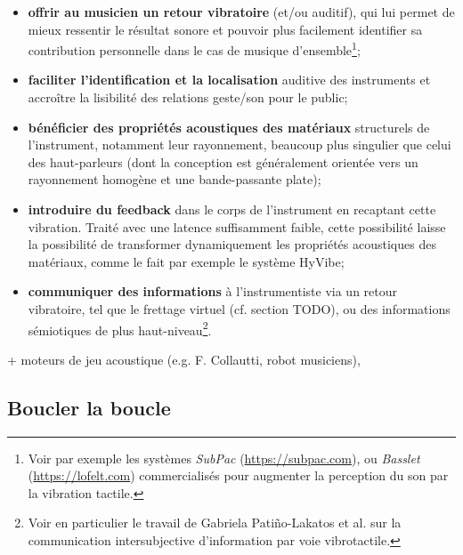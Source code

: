 \vspace{-1em}
\begin{itemize}[noitemsep]
	\item \textbf{offrir au musicien un retour vibratoire} (et/ou auditif), qui lui permet de mieux ressentir le résultat sonore et pouvoir plus facilement identifier sa contribution personnelle dans le cas de musique d'ensemble\footnote{Voir par exemple les systèmes \textit{SubPac} (\url{https://subpac.com}), ou \textit{Basslet} (\url{https://lofelt.com}) commercialisés pour augmenter la perception du son par la vibration tactile.};
	\item \textbf{faciliter l'identification et la localisation} auditive des instruments et accroître la lisibilité des relations geste/son pour le public;
	\item \textbf{bénéficier des propriétés acoustiques des matériaux} structurels de l'instrument, notamment leur rayonnement, beaucoup plus singulier que celui des haut-parleurs (dont la conception est généralement orientée vers un rayonnement homogène et une bande-passante plate);
	\item \textbf{introduire du feedback} dans le corps de l'instrument en recaptant cette vibration. Traité avec une latence suffisamment faible, cette possibilité laisse la possibilité de transformer dynamiquement les propriétés acoustiques des matériaux, comme le fait par exemple le système HyVibe;
	\item \textbf{communiquer des informations} à l'instrumentiste via un retour vibratoire, tel que le frettage virtuel (cf. section TODO), ou des informations sémiotiques de plus haut-niveau\footnote{Voir en particulier le travail de Gabriela Patiño-Lakatos et al. \cite{patino-lakatos_paradigmes_2019} sur la communication intersubjective d'information par voie vibrotactile.}.
\end{itemize}


+ moteurs de jeu acoustique (e.g. F. Collautti, robot musiciens), 

\subsection{Boucler la boucle}

